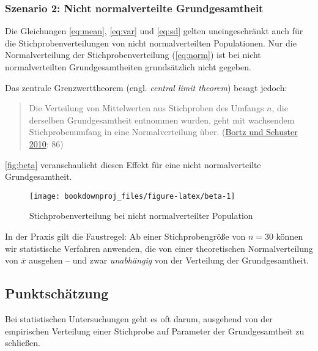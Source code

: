 \documentclass[
  ngerman,
]{article}
\begin{document}
\hypertarget{szenario-2-nicht-normalverteilte-grundgesamtheit}{%
\subsubsection{Szenario 2: Nicht normalverteilte Grundgesamtheit}\label{szenario-2-nicht-normalverteilte-grundgesamtheit}}

Die Gleichungen \ref{eq:mean}, \ref{eq:var} und \ref{eq:sd} gelten uneingeschränkt auch für die Stichprobenverteilungen von nicht normalverteilten Populationen. Nur die Normalverteilung der Stichprobenverteilung (\autoref{eq:norm}) ist bei nicht normalverteilten Grundgesamtheiten grundsätzlich nicht gegeben.

Das zentrale Grenzwerttheorem (engl. \emph{central limit theorem}) besagt jedoch:

\begin{quote}
Die Verteilung von Mittelwerten aus Stichproben des Umfangs \(n\), die derselben Grundgesamtheit entnommen wurden, geht mit wachsendem Stichprobenumfang in eine Normalverteilung über. (\protect\hyperlink{ref-bortz}{Bortz und Schuster 2010}: 86)
\end{quote}

\autoref{fig:beta} veranschaulicht diesen Effekt für eine nicht normalverteilte Grundgesamtheit.

\begin{figure}[h]

{\centering \texttt{[image: bookdownproj\_files/figure-latex/beta-1]} 

}

\caption{Stichprobenverteilung bei nicht normalverteilter Population}\label{fig:beta}
\end{figure}

In der Praxis gilt die Faustregel: Ab einer Stichprobengröße von \(n=30\) können wir statistische Verfahren anwenden, die von einer theoretischen Normalverteilung von \(\bar{x}\) ausgehen -- und zwar \emph{unabhängig} von der Verteilung der Grundgesamtheit.

\hypertarget{punktschuxe4tzung}{%
\subsection{Punktschätzung}\label{punktschuxe4tzung}}

Bei statistischen Untersuchungen geht es oft darum, ausgehend von der empirischen Verteilung einer Stichprobe auf Parameter der Grundgesamtheit zu schließen.
\end{document}
